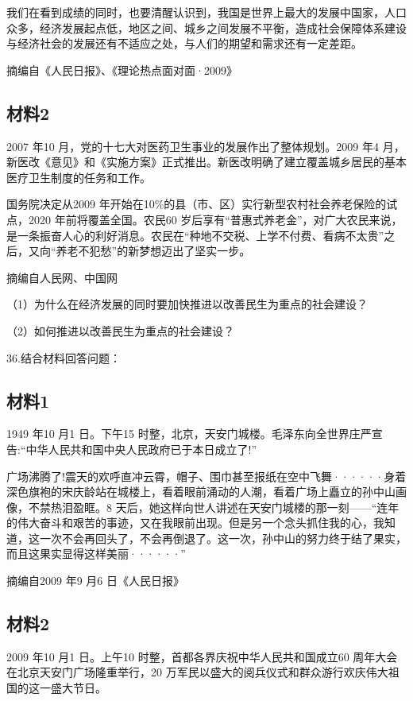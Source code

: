 \documentclass[UTF8,11pt]{ctexart}
\begin{document}
我们在看到成绩的同时，也要清醒认识到，我国是世界上最大的发展中国家，人口众多，经济发展起点低，地区之间、城乡之间发展不平衡，造成社会保障体系建设与经济社会的发展还有不适应之处，与人们的期望和需求还有一定差距。

摘编自《人民日报》、《理论热点面对面·2009》

\subsection*{材料2}

2007 年10 月，党的十七大对医药卫生事业的发展作出了整体规划。2009 年4 月，新医改《意见》和《实施方案》正式推出。新医改明确了建立覆盖城乡居民的基本医疗卫生制度的任务和工作。

国务院决定从2009 年开始在10\%的县（市、区）实行新型农村社会养老保险的试点，2020 年前将覆盖全国。农民60 岁后享有“普惠式养老金”，对广大农民来说，是一条振奋人心的利好消息。农民在“种地不交税、上学不付费、看病不太贵”之后，又向“养老不犯愁”的新梦想迈出了坚实一步。

摘编自人民网、中国网

（1）为什么在经济发展的同时要加快推进以改善民生为重点的社会建设？


（2）如何推进以改善民生为重点的社会建设？


36.结合材料回答问题：


\subsection*{材料1}

1949 年10 月1 日。下午15 时整，北京，天安门城楼。毛泽东向全世界庄严宣告:“中华人民共和国中央人民政府已于本日成立了!”

广场沸腾了!震天的欢呼直冲云霄，帽子、围巾甚至报纸在空中飞舞······身着深色旗袍的宋庆龄站在城楼上，看着眼前涌动的人潮，看着广场上矗立的孙中山画像，不禁热泪盈眶。8 天后，她这样向世人讲述在天安门城楼的那一刻——“连年的伟大奋斗和艰苦的事迹，又在我眼前出现。但是另一个念头抓住我的心，我知道，这一次不会再回头了，不会再倒退了。这一次，孙中山的努力终于结了果实，而且这果实显得这样美丽······”

摘编自2009 年9 月6 日《人民日报》

\subsection*{材料2}

2009 年10 月1 日。上午10 时整，首都各界庆祝中华人民共和国成立60 周年大会在北京天安门广场隆重举行，20 万军民以盛大的阅兵仪式和群众游行欢庆伟大祖国的这一盛大节日。
\end{document}
